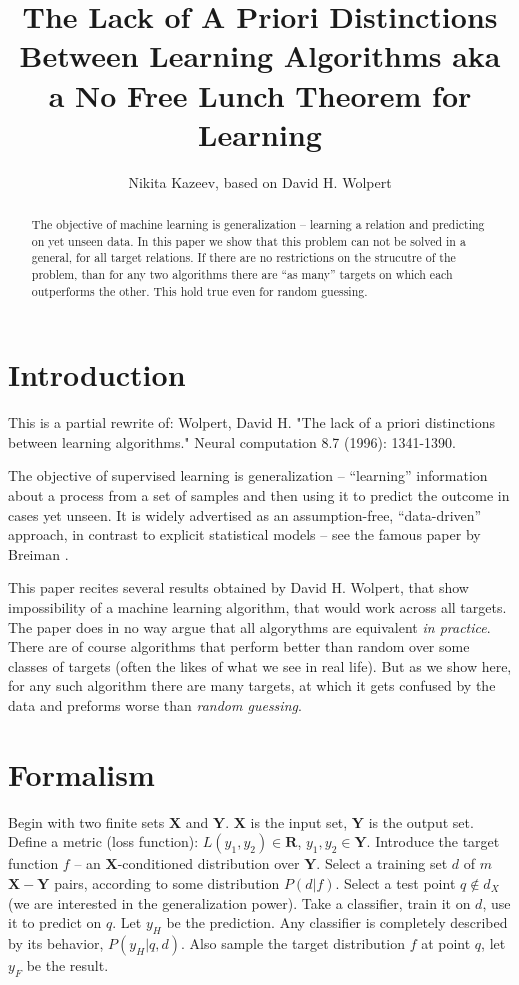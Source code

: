 \documentclass[a4paper]{article}
\title{The Lack of A Priori Distinctions Between Learning Algorithms aka
a No Free Lunch Theorem for Learning}
\author{Nikita Kazeev, based on David H. Wolpert}
\begin{document}
\maketitle
\begin{abstract}
  The objective of machine learning is generalization -- learning a
  relation and predicting on yet unseen data. In this paper we show
  that this problem can not be solved in a general, for all target
  relations. If there are no restrictions on the strucutre of the
  problem, than for any two algorithms there are ``as many'' targets
  on which each outperforms the other. This hold true even for random
  guessing.
\end{abstract}

\section{Introduction}
This is a partial rewrite of: Wolpert, David H. "The lack of a priori
distinctions between learning algorithms." Neural computation 8.7
(1996): 1341-1390.

The objective of supervised learning is generalization -- ``learning''
information about a process from a set of samples and then using it to
predict the outcome in cases yet unseen. It is widely advertised as an
assumption-free, ``data-driven'' approach, in contrast to explicit
statistical models -- see the famous paper by Breiman \cite{breiman}.

This paper recites several results obtained by David H. Wolpert, that
show impossibility of a machine learning algorithm, that would work
across all targets. The paper does in no way argue that all algorythms
are equivalent \textit{in practice}. There are of course algorithms
that perform better than random over some classes of targets (often
the likes of what we see in real life). But as we show here, for any
such algorithm there are many targets, at which it gets confused by
the data and preforms worse than \textit{random guessing}.

\section{Formalism}
Begin with two finite sets $\mathbf{X}$ and $\mathbf{Y}$. $\mathbf{X}$
is the input set, $\mathbf{Y}$ is the output set. Define a metric
(loss function): $L(y_1, y_2) \in \mathbf{R}$,
$y_1, y_2 \in \mathbf{Y}$. Introduce the target function $f$ -- an
$\mathbf{X}$-conditioned distribution over $\mathbf{Y}$. Select a
training set $d$ of $m$ $\mathbf{X}-\mathbf{Y}$ pairs, according to
some distribution $P(d|f)$. Select a test point $q \notin d_X$ (we are
interested in the generalization power). Take a classifier, train it
on $d$, use it to predict on $q$. Let $y_H$ be the prediction. Any
classifier is completely described by its behavior, $P(y_H|q,d)$. Also
sample the target distribution $f$ at point $q$, let $y_F$ be the
result.
\end{document}
